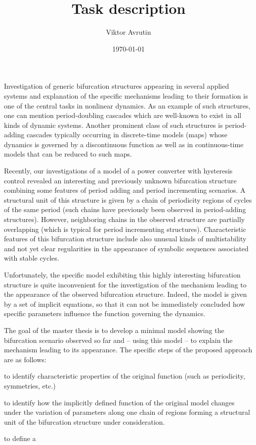\documentclass{article}
\begin{document}
\title{Task description}
\author{Viktor Avrutin}
\date{\today}
\maketitle

Investigation of generic bifurcation structures appearing in several
applied systems and explanation of the specific mechanisms leading to
their formation is one of the central tasks in nonlinear dynamics.
As an example of such structures, one can mention period-doubling cascades
which are well-known to exist in all kinds of dynamic systems.
Another prominent class of such structures is period-adding cascades
typically occurring in discrete-time models (maps) whose dynamics is
governed by a discontinuous function as well as in continuous-time
models that can be reduced to such maps.

Recently, our investigations of a model of a power converter with
hysteresis control revealed an interesting and previously unknown
bifurcation structure combining some features of period adding and
period incrementing scenarios.  A structural unit of this structure is
given by a chain of periodicity regions of cycles of the same period
(such chains have previously been observed in period-adding structures).
However, neighboring chains in the observed structure are
partially overlapping (which is typical for period incrementing structures).
Characteristic features of this bifurcation structure
include also unusual kinds of multistability and not yet clear
regularities in the appearance of symbolic sequences associated with
stable cycles.

Unfortunately, the specific model exhibiting this highly interesting
bifurcation structure is quite inconvenient for the investigation of the mechanism
leading to the appearance of the observed bifurcation
structure. Indeed, the model is given by a set of implicit equations,
so that it can not be immediately concluded how specific parameters
influence the function governing the dynamics.

The goal of the master thesis is to develop a minimal model showing
the bifurcation scenario observed so far and -- using this model -- to
explain the mechanism leading to its appearance.  The specific steps
of the proposed approach are as follows:
\begin{compactenum}
\item to identify characteristic properties of the original function
  (such as periodicity, symmetries, etc.)
\item to identify how the implicitly defined function of the original
  model changes under the variation of parameters along one chain of regions
  forming a structural unit of the bifurcation structure under consideration.
\item to define a 
\end{compactenum}
\end{document}

